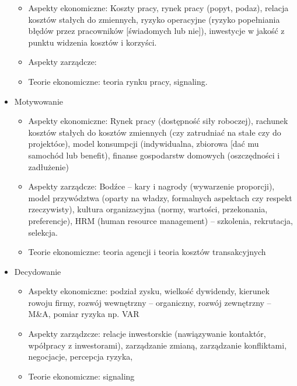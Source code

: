 \documentclass[a4paper,10pt]{report}
\begin{document}
\begin{itemize}
	\begin{itemize}
		\item Aspekty ekonomiczne: Koszty pracy, rynek pracy (popyt, podaz), relacja kosztów stałych do zmiennych, ryzyko operacyjne (ryzyko popełniania błędów przez pracowników [świadomych lub nie]), inwestycje w jakość z punktu widzenia kosztów i korzyści.
		\item Aspekty zarządcze:
		\item Teorie ekonomiczne: teoria rynku pracy, signaling.
	\end{itemize}
	\item Motywowanie
	\begin{itemize}
		\item Aspekty ekonomiczne: Rynek pracy (dostępność siły roboczej), rachunek kosztów stałych do kosztów zmiennych (czy zatrudniać na stałe czy do projektóœ), model konsumpcji (indywidualna, zbiorowa [dać mu samochód lub benefit), finanse gospodarstw domowych (oszczędności i zadłużenie)
		\item Aspekty zarządcze: Bodźce -- kary i nagrody (wywarzenie proporcji), model przywództwa (oparty na władzy, formalnych aspektach czy respekt rzeczywisty), kultura organizacyjna (normy, wartości, przekonania, preferencje), HRM (human resource management) -- szkolenia, rekrutacja, selekcja.
		\item Teorie ekonomiczne: teoria agencji i teoria kosztów transakcyjnych
	\end{itemize}
	\item Decydowanie
	\begin{itemize}
		\item Aspekty ekonomiczne: podział zysku, wielkość dywidendy, kierunek rowoju firmy, rozwój wewnętrzny -- organiczny, rozwój zewnętrzny -- M\&A, pomiar ryzyka np. VAR
		\item Aspekty zarządzcze: relacje inwestorskie (nawiązywanie kontaktór, wpółpracy z inwestorami), zarządzanie zmianą, zarządzanie konfliktami, negocjacje, percepcja ryzyka,  
		\item Teorie ekonomiczne: signaling
	\end{itemize}
\end{itemize}
\end{document}
